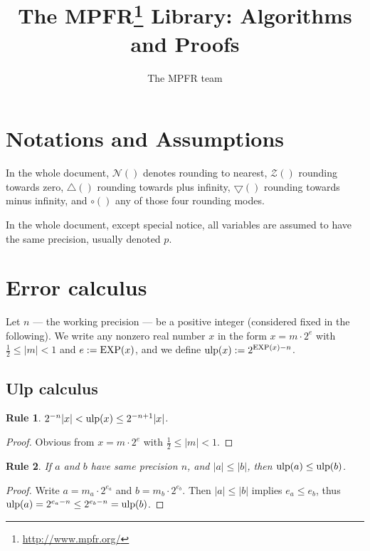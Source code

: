 \documentclass[12pt]{amsart}
\title{The MPFR\footnote{\lowercase{\url{http://www.mpfr.org/}}} Library:
Algorithms and Proofs}
\author{The MPFR team}
\def\pinf{\bigtriangleup}
\def\minf{\bigtriangledown}
\def\ulp{{\rm ulp}}
\def\Z{{\mathcal Z}}
\def\N{{\mathcal N}}
\newtheorem{Rule}{Rule}
\begin{document}
\maketitle
\sloppy

\tableofcontents

\section{Notations and Assumptions}

In the whole document, $\N()$ denotes rounding to nearest,
$\Z()$ rounding towards zero,
$\pinf()$ rounding towards plus infinity,
$\minf()$ rounding towards minus infinity,
and $\circ()$ any of those four rounding modes.

In the whole document, except special notice, all variables are assumed
to have the same precision, usually denoted $p$.

\section{Error calculus}

Let $n$ --- the working precision ---
be a positive integer (considered fixed in the following).
We write any nonzero real number $x$ in the form $x = m \cdot 2^e$
with $\frac{1}{2} \le |m| < 1$ and $e := {\rm EXP}(x)$, and
we define $\ulp(x) := 2^{{\rm EXP}(x) - n}$.

\subsection{Ulp calculus}

\begin{Rule} \label{R1}
$2^{-n} |x| < \ulp(x) \le 2^{-n+1} |x|$.
\end{Rule}
\begin{proof}
Obvious from $x = m \cdot 2^e$ with $\frac{1}{2} \le |m| < 1$.
\end{proof}

\begin{Rule} \label{R2}
If $a$ and $b$ have same precision $n$,
and $|a| \le |b|$, then $\ulp(a) \le \ulp(b)$.
\end{Rule}
\begin{proof}
Write $a = m_a \cdot 2^{e_a}$ and $b = m_b \cdot 2^{e_b}$.
Then $|a| \le |b|$ implies $e_a \le e_b$, thus
$\ulp(a) = 2^{e_a-n} \le 2^{e_b-n} = \ulp(b)$.
\end{proof}
\end{document}
